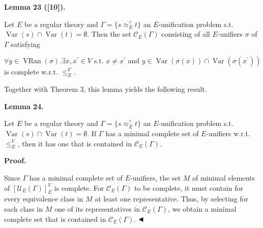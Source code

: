 \documentclass[10pt,a4paper]{amsart}
\begin{document}
 
 
\par\medskip\noindent\textbf{Lemma 23 ([10]).}\par
 
 
Let $E$ be a regular theory and $\Gamma=\{s\approx_{E}^{?}t\}$ an $E$-unification problem s.t. $\operatorname{Var}(s)\cap\operatorname{Var}(t)=\emptyset$. Then the set $\mathcal{C}_{E}(\Gamma)$ consisting of all $E$-unifiers $\sigma$ of $\Gamma$ satisfying\par
    \[\forall y\in\operatorname{VRan}(\sigma).\exists x,x^{\prime}\in V\text{ s.t. }%
x\neq x^{\prime}\text{ and }y\in\operatorname{Var}(\sigma(x))\cap\operatorname%
{Var}(\sigma(x^{\prime}))\]    
is complete w.r.t. $\leq_{E}^{V}$.\par
 
 
 
 
Together with Theorem 3, this lemma yields the following result.\par
 
 
 
\par\medskip\noindent\textbf{Lemma 24.}\par
 
 
Let $E$ be a regular theory and $\Gamma=\{s\approx_{E}^{?}t\}$ an $E$-unification problem s.t. $\operatorname{Var}(s)\cap\operatorname{Var}(t)=\emptyset$. If $\Gamma$ has a minimal complete set of $E$-unifiers w.r.t. $\leq_{E}^{V}$, then it has one that is contained in $\mathcal{C}_{E}(\Gamma)$.\par
 
 
 
 
\par\medskip\noindent\textbf{Proof.}\par
 
 
Since $\Gamma$ has a minimal complete set of $E$-unifiers, the set $M$ of minimal elements of $[\mathcal{U}_{E}(\Gamma)]_{E}^{V}$ is complete. For $\mathcal{C}_{E}(\Gamma)$ to be complete, it must contain for every equivalence class in $M$ at least one representative. Thus, by selecting for each class in $M$ one of its representatives in $\mathcal{C}_{E}(\Gamma)$, we obtain a minimal complete set that is contained in $\mathcal{C}_{E}(\Gamma)$. $\hfill\blacktriangleleft$\par
 
\end{document}
